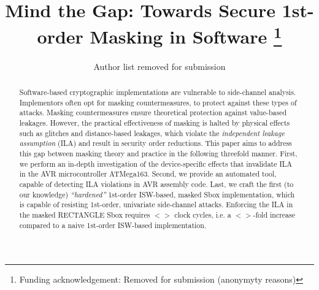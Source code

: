 \documentclass[runningheads, a4paper, 10pt]{llncs}
\begin{document}



\title{Mind the Gap: Towards Secure 1st-order Masking in Software
\thanks{
Funding acknowledgement: Removed for submission (anonymyty reasons)
}}


\author{Author list removed for submission}


\maketitle

\begin{abstract}
Software-based cryptographic implementations are vulnerable to side-channel analysis. 
Implementors often opt for masking countermeasures, to protect against these types of attacks.
Masking countermeasures ensure theoretical protection against value-based leakages. However, the practical effectiveness of masking is halted by 
physical effects such as glitches and distance-based leakages, which violate the \emph{independent leakage assumption} (ILA) and result in security order reductions. This paper aims to address this gap between masking theory and practice in the following threefold manner. First, we perform an in-depth investigation of the device-specific effects that invalidate ILA in the AVR microcontroller ATMega163. Second, we provide an automated tool, capable of detecting ILA violations in AVR assembly code. Last, we craft the first (to our knowledge) \emph{``hardened''} 1st-order ISW-based, masked Sbox implementation, which is capable of resisting 1st-order, univariate side-channel attacks. Enforcing the ILA in the masked RECTANGLE Sbox requires $<>$ clock cycles, i.e. a $<>$-fold increase compared  to a naive 1st-order ISW-based implementation. 


\end{abstract}










\end{document}
